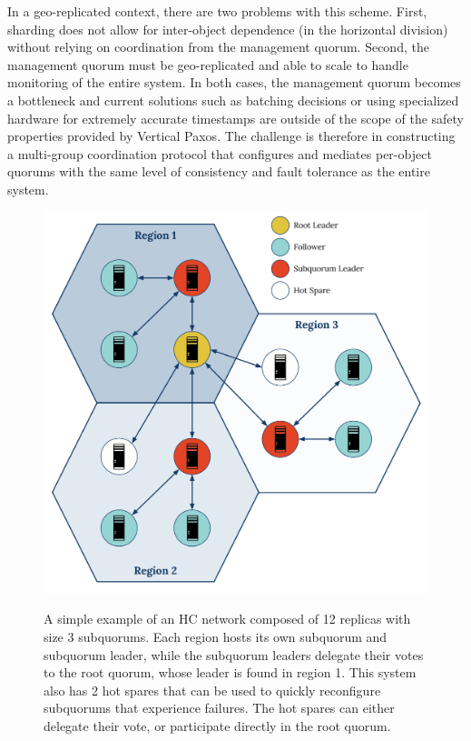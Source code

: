 In a geo-replicated context, there are two problems with this scheme.
First, sharding does not allow for inter-object dependence (in the horizontal division) without relying on coordination from the management quorum.
Second, the management quorum must be geo-replicated and able to scale to handle monitoring of the entire system.
In both cases, the management quorum becomes a bottleneck and current solutions such as batching decisions or using specialized hardware for extremely accurate timestamps are outside of the scope of the safety properties provided by Vertical Paxos.
The challenge is therefore in constructing a multi-group coordination protocol that configures and mediates per-object quorums with the same level of consistency and fault tolerance as the entire system.

\begin{figure}
    \begin{center}
        \includegraphics[width=5in]{figures/ch03_hierarchical_topology.pdf}
    \end{center}
    \renewcommand{\baselinestretch}{1}
    \small\normalsize

    \begin{quote}
        \caption[A 12x3 Hierarchical Consensus Network Topology]{A simple example of an HC network composed of 12 replicas with size 3 subquorums. Each region hosts its own subquorum and subquorum leader, while the subquorum leaders delegate their votes to the root quorum, whose leader is found in region 1. This system also has 2 hot spares that can be used to quickly reconfigure subquorums that experience failures. The hot spares can either delegate their vote, or participate directly in the root quorum.}
        \label{fig:ch03_hierarchical_topology}
    \end{quote}
\end{figure}
\renewcommand{\baselinestretch}{2}
\small\normalsize

